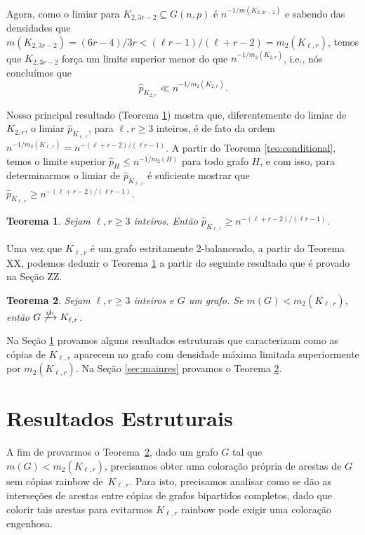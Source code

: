 \documentclass[12pt,a4paper]{book}
\newcommand{\K}{K_{\ell,r}} %
\newcommand{\rb}{\xrightarrow{\text{\rm rb}}}
\let\subset\subseteq
\newtheorem{teorema}{Teorema}[chapter]
\begin{document}
    Agora, como  o limiar para
    $K_{2,3r-2}\subset G(n,p)$ é $n^{-1/m(K_{2,3r-2})}$ e sabendo das densidades que
    $m(K_{2,3r-2}) = (6r-4)/3r < (\ell r - 1)/(\ell+r-2) =
    m_2(K_{\ell,r})$, 
    temos que $K_{2,3r-2}$ força um limite superior menor do que
     $n^{-1/m_2(K_{2,r})}$, i.e., nós concluímos que
    \[ 
      \hat{p}_{K_{2,r}} \ll n^{-1/m_2(K_{2,r})}.
    \]

    Nosso principal resultado (Teorema \ref{teo:mainrb}) mostra que, diferentemente do limiar de $K_{2,r}$,
    o limiar $\hat{p}_{\K}$, para $\ell,r \geq 3$ inteiros, é de fato da ordem 
    $n^{-1/m_2(\K)} = n^{-(\ell+r-2)/(\ell r-1)}$.
    A partir do Teorema \ref{teo:conditional}, temos o limite superior $\hat{p}_H \leq n^{-1/m_2(H)}$ para todo grafo $H$, e com isso, para determinarmos o limiar de $\hat{p}_{\K}$ é suficiente mostrar que 
    $\hat{p}_{\K}\geq n^{-(\ell+r-2)/(\ell r - 1)}$.

    \begin{teorema}\label{teo:mainrb} 
    Sejam $\ell,r \geq 3$ inteiros. 
    Então $\hat{p}_{K_{\ell,r}}\geq n^{-(\ell+r-2)/(\ell r - 1)}$.
    \end{teorema}

    Uma vez que $\K$ é um grafo estritamente 2-balanceado, a partir do Teorema XX, podemos deduzir o Teorema \ref{teo:mainrb} a partir do seguinte resultado que é provado na Seção ZZ.
    
    \begin{teorema}\label{lemma:main} 
        Sejam $\ell,r \geq 3$ inteiros e
        $G$ um grafo. 
        Se $m(G) < m_2(\K)$, então $G \not\rb \K$.
    \end{teorema}

    Na Seção \ref{sec:rbestrut} provamos alguns resultados estruturais que caracterizam como as cópias de $\K$ aparecem no grafo com densidade máxima limitada superiormente por $m_2(\K)$.
    Na Seção \ref{sec:mainres} provamos o Teorema \ref{lemma:main}.

\section{Resultados Estruturais}
\label{sec:rbestrut}

     A fim de provarmos o Teorema~\ref{lemma:main}, dado um grafo $G$ tal que
     $m(G) < m_2(\K)$, 
     precisamos obter uma coloração própria de arestas de $G$ sem cópias rainbow de~$\K$. 
     Para isto, precisamos analisar como se dão as interseções de arestas entre cópias de grafos bipartidos completos, dado que colorir tais arestas para evitarmos $\K$ rainbow pode exigir uma coloração engenhosa. 
     
\end{document}
